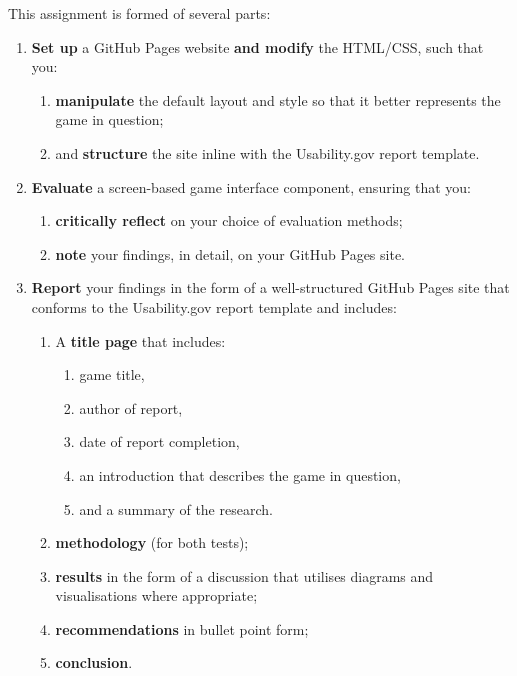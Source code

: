 \documentclass{../../fal_assignment}
\begin{document}
This assignment is formed of several parts:

\begin{enumerate}[label=(\alph*)]
	\item \textbf{Set up} a GitHub Pages website \textbf{and modify} the HTML/CSS, such that you: 
    		\begin{enumerate}[label=\roman*.]
    			\item \textbf{manipulate} the default layout and style so that it better represents the game in question;
    			\item and \textbf{structure} the site inline with the Usability.gov report template.
		\end{enumerate}
	\item \textbf{Evaluate} a screen-based game interface component, ensuring that you:
    		\begin{enumerate}[label=\roman*.]
    			\item \textbf{critically reflect} on your choice of evaluation methods;
			\item \textbf{note} your findings, in detail, on your GitHub Pages site.
		\end{enumerate}
    	\item \textbf{Report} your findings in the form of a well-structured GitHub Pages site that conforms to the Usability.gov report template and includes: 
    		\begin{enumerate}[label=\roman*.]
			\item A \textbf{title page} that includes:
				\begin{enumerate}[label=\roman*.]
					\item game title,
					\item author of report,
			 		\item date of report completion,
					\item an introduction that describes the game in question,
					\item and a summary of the research.
				\end{enumerate}    		
			\item \textbf{methodology} (for both tests);
    			\item \textbf{results} in the form of a discussion that utilises diagrams and visualisations where appropriate;
    			\item \textbf{recommendations} in bullet point form;
			\item \textbf{conclusion}.
		\end{enumerate}
	
\end{enumerate}
\end{document}
